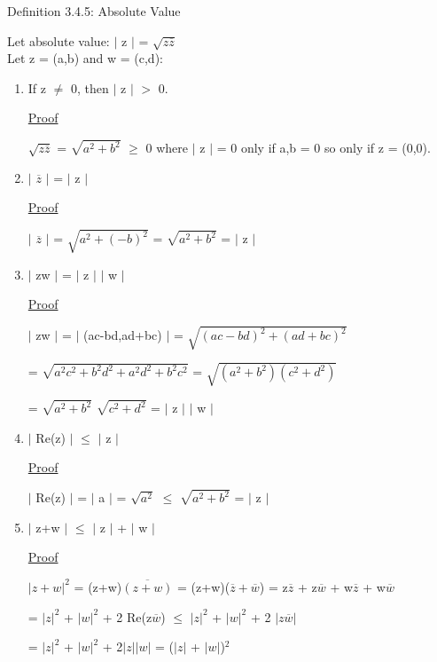 { \color{blue} Definition 3.4.5: Absolute Value } 
	
	\qquad Let absolute value: $|$ z $|$ = $\sqrt{z \overline{z}}$ \\

	\qquad Let z = (a,b) and w = (c,d):
	\begin{enumerate}[label=(\alph*), leftmargin=2cm, itemsep=0.4em]
		\item If z $\neq$ 0, then $|$ z $|$ $>$ 0.

			{ \color{magenta} \underline{Proof} } 
			
				$\sqrt{z\overline{z}}$ = $\sqrt{a^2 + b^2}$ $\geq$ 0
				where $|$ z $|$ = 0 only if a,b = 0 so only if z = (0,0).

		\item $|$ $\overline{z}$ $|$ = $|$ z  $|$

			{ \color{magenta} \underline{Proof} } 
			
				$|$ $\overline{z}$ $|$ = $\sqrt{a^2 + (-b)^2}$ = $\sqrt{a^2 + b^2}$ = $|$ z $|$

		\item $|$ zw $|$ = $|$ z $|$ $|$ w $|$

			{ \color{magenta} \underline{Proof} } 
			
				$|$ zw $|$ = $|$ (ac-bd,ad+bc) $|$ = $\sqrt{(ac-bd)^2 + (ad+bc)^2}$
			
				= $\sqrt{a^2c^2 + b^2d^2 + a^2d^2 + b^2c^2}$
				= $\sqrt{(a^2+b^2)(c^2+d^2)}$

				= $\sqrt{a^2+b^2}$ $\sqrt{c^2+d^2}$ = $|$ z $|$ $|$ w $|$

		\item $|$ Re(z) $|$ $\leq$ $|$ z $|$

			{ \color{magenta} \underline{Proof} } 
			
				$|$ Re(z) $|$ = $|$ a $|$ = $\sqrt{a^2}$ $\leq$ $\sqrt{a^2+b^2}$ = $|$ z $|$

		\item $|$ z+w $|$ $ \leq $  $|$ z $|$ + $|$ w $|$

			{ \color{magenta} \underline{Proof} } 
			
				$| z+w |^2$ = (z+w)$\overline{(z+w)}$ = (z+w)($\overline{z} + \overline{w}$)
				= z$\overline{z}$ + z$\overline{w}$ + w$\overline{z}$ + w$\overline{w}$
			
				= $|z|^2$ + $|w|^2$ + 2 Re(z$\overline{w}$)
				$\leq$ $|z|^2$ + $|w|^2$ + 2 $|z\overline{w}|$

				= $|z|^2$ + $|w|^2$ + 2$|z||w|$
				= ($|z|$ + $|w|$)$^2$
	\end{enumerate}


